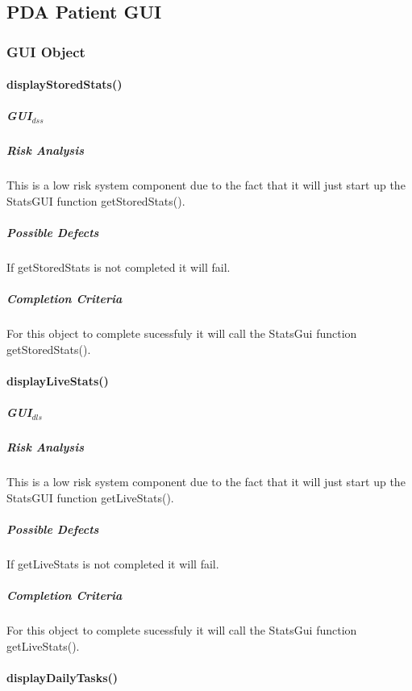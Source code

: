 \documentclass{article}
\begin{document}
\subsection{PDA Patient GUI}

\subsubsection{GUI Object}

\paragraph{displayStoredStats()}

\subparagraph{GUI$_{dss}$}

\subparagraph{Risk Analysis}
This is a low risk system component due to the fact that it will just start up the StatsGUI function getStoredStats().

\subparagraph{Possible Defects}
If getStoredStats is not completed it will fail.

\subparagraph{Completion Criteria}
For this object to complete sucessfuly it will call the StatsGui function getStoredStats().



\paragraph{displayLiveStats()}

\subparagraph{GUI$_{dls}$}

\subparagraph{Risk Analysis}
This is a low risk system component due to the fact that it will just start up the StatsGUI function getLiveStats().

\subparagraph{Possible Defects}
If getLiveStats is not completed it will fail.

\subparagraph{Completion Criteria}
For this object to complete sucessfuly it will call the StatsGui function getLiveStats().

\paragraph{displayDailyTasks()}
\end{document}
